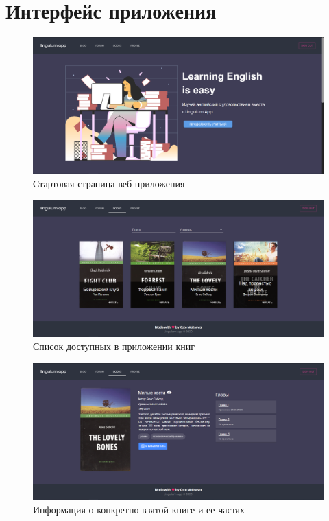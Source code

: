 \chapter{Интерфейс приложения}
\label{cha:appendix2}

\begin{figure}[h]
	\centering
	\includegraphics[width=\textwidth]{figures/start}
	\caption{Стартовая страница веб-приложения}
	\label{fig:start}
\end{figure}

\begin{figure}[h]
	\centering
	\includegraphics[width=\textwidth]{figures/booklist}
	\caption{Список доступных в приложении книг}
	\label{fig:booklist}
\end{figure}

\begin{figure}[h]
	\centering
	\includegraphics[width=\textwidth]{figures/bookitem}
	\caption{Информация о конкретно взятой книге и ее частях}
	\label{fig:bookitem}
\end{figure}

